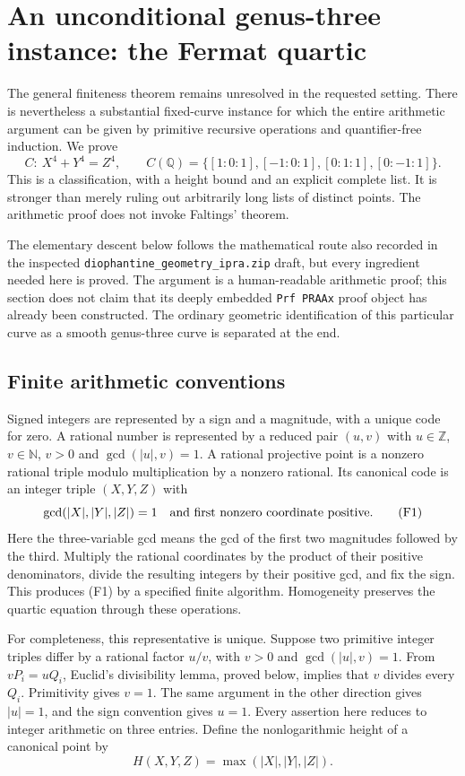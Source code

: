 \section{An unconditional genus-three instance: the Fermat quartic}
\label{sec:fermat-instance}

The general finiteness theorem remains unresolved in the requested setting.
There is nevertheless a substantial fixed-curve instance for which the
entire arithmetic argument can be given by primitive recursive operations
and quantifier-free induction.  We prove
\[
 C:\ X^4+Y^4=Z^4,
 \qquad
 C(\mathbb Q)=
 \{[1:0:1],[-1:0:1],[0:1:1],[0:-1:1]\}.
 \tag{FQ}\label{eq:fq-points}
\]
This is a classification, with a height bound and an explicit complete list.
It is stronger than merely ruling out arbitrarily long lists of distinct
points.  The arithmetic proof does not invoke Faltings' theorem.

The elementary descent below follows the mathematical route also recorded
in the inspected \texttt{diophantine\_geometry\_ipra.zip} draft, but every
ingredient needed here is proved.  The argument is a human-readable
arithmetic proof; this section does not claim that its deeply embedded
\texttt{Prf PRAAx} proof object has already been constructed.  The ordinary
geometric identification of this particular curve as a smooth genus-three
curve is separated at the end.

\subsection{Finite arithmetic conventions}

Signed integers are represented by a sign and a magnitude, with a unique
code for zero.  A rational number is represented by a reduced pair
$(u,v)$ with $u\in\mathbb Z$, $v\in\mathbb N$, $v>0$ and
$\gcd(|u|,v)=1$.  A rational projective point is a nonzero rational triple
modulo multiplication by a nonzero rational.  Its canonical code is an
integer triple $(X,Y,Z)$ with
\[
 \gcd(|X|,|Y|,|Z|)=1
 \quad\hbox{and first nonzero coordinate positive}.
 \tag{F1}
\]
Here the three-variable gcd means the gcd of the first two magnitudes
followed by the third.  Multiply the rational coordinates by the product
of their positive denominators, divide the resulting integers by their
positive gcd, and fix the sign.  This produces (F1) by a specified finite
algorithm.  Homogeneity preserves the quartic equation through these
operations.

For completeness, this representative is unique.  Suppose two primitive
integer triples differ by a rational factor $u/v$, with $v>0$ and
$\gcd(|u|,v)=1$.  From $vP_i=uQ_i$, Euclid's divisibility lemma, proved
below, implies that $v$ divides every $Q_i$.  Primitivity gives $v=1$.
The same argument in the other direction gives $|u|=1$, and the sign
convention gives $u=1$.  Every assertion here reduces to integer arithmetic
on three entries.  Define the nonlogarithmic height of a canonical point by
\[
 H(X,Y,Z)=\max(|X|,|Y|,|Z|).
\]

